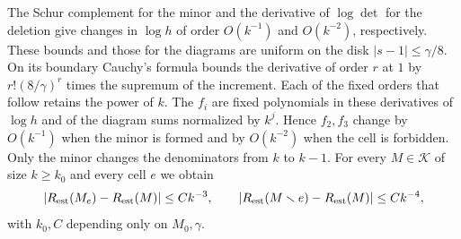 The Schur complement for the minor and the derivative of $\log\det$ for the deletion give changes
in $\log h$ of order $O(k^{-1})$ and $O(k^{-2})$, respectively. These bounds and those for the
diagrams are uniform on the disk $|s-1|\le\gamma/8$. On its boundary Cauchy's formula bounds the
derivative of order $r$ at $1$ by $r!(8/\gamma)^r$ times the supremum of the increment. Each of
the fixed orders that follow retains the power of $k$. The $f_i$ are fixed polynomials in these
derivatives of $\log h$ and of the diagram sums normalized by $k^j$. Hence $f_2,f_3$ change by
$O(k^{-1})$ when the minor is formed and by $O(k^{-2})$ when the cell is forbidden. Only the minor
changes the denominators from $k$ to $k-1$. For every $M\in\mathcal K$ of size $k\ge k_0$ and
every cell $e$ we obtain
\[
 |R_{\rm est}(M_e)-R_{\rm est}(M)|\le C k^{-3},\qquad
 |R_{\rm est}(M\setminus e)-R_{\rm est}(M)|\le C k^{-4},
\]
with $k_0,C$ depending only on $M_0,\gamma$.
